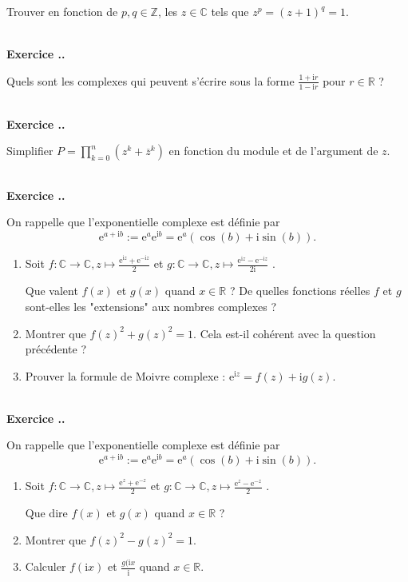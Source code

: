 \documentclass{article}
\newcommand{\im}{\text{i}}
\newcommand{\mb}[1]{\mathbb{#1}}
\newcounter{exo}
\newcommand{\exercice}[1][\null]{\textbf{\\ Exercice \thesection.\theexo. #1} \addtocounter{exo}{1}}
\begin{document}
Trouver en fonction de $p,q \in \mb{Z}$, les $z \in \mb{C}$ tels que $z^p = (z+1)^q = 1$.

\exercice

Quels sont les complexes qui peuvent s'écrire sous la forme $\frac{1+ \im r}{1- \im r}$ pour $r \in \mb{R}$ ?

\exercice

Simplifier $\displaystyle P = \prod_{k=0}^n(z^k + \overline{z}^{k})$ en fonction du module et de l'argument de $z$.




\exercice

On rappelle que l'exponentielle complexe est définie par $$\text{e}^{a+\text{i}b} := \text{e}^{a} \text{e}^{\text{i}b} = \text{e}^{a} (\cos(b) + \text{i} \sin(b)).$$

\begin{enumerate}


\item Soit $f: \mb{C} \rightarrow \mb{C}, z \mapsto \frac{\text{e}^{\text{i}z}+\text{e}^{-\text{i}z}}{2}$ et $g: \mb{C} \rightarrow \mb{C}, z \mapsto \frac{\text{e}^{\text{i}z}-\text{e}^{-\text{i}z}}{2\text{i}}$ .

Que valent $f(x)$ et $g(x)$ quand $x \in \mb{R}$ ? De quelles fonctions réelles $f$ et $g$ sont-elles les "extensions" aux nombres complexes ?

\item Montrer que $f(z)^2 + g(z)^2 = 1$. Cela est-il cohérent avec la question précédente ?

\item Prouver la formule de Moivre complexe : $\text{e}^{\text{i}z} = f(z) + \text{i} g(z)$.

\end{enumerate}




\exercice


On rappelle que l'exponentielle complexe est définie par $$\text{e}^{a+\text{i}b} := \text{e}^{a} \text{e}^{\text{i}b} = \text{e}^{a} (\cos(b) + \text{i} \sin(b)).$$
\begin{enumerate}


\item Soit $f: \mb{C} \rightarrow \mb{C}, z \mapsto \frac{\text{e}^{z}+\text{e}^{-z}}{2}$ et $g: \mb{C} \rightarrow \mb{C}, z \mapsto \frac{\text{e}^{z}-\text{e}^{-z}}{2}$ .

Que dire $f(x)$ et $g(x)$ quand $x \in \mb{R}$ ?

\item Montrer que $f(z)^2 - g(z)^2 = 1$.

\item Calculer $f(\text{i} x)$ et  $\frac{g(\text{i} x}{\text{i}}$ quand $x \in \mb{R}$.

\end{enumerate}
\end{document}
